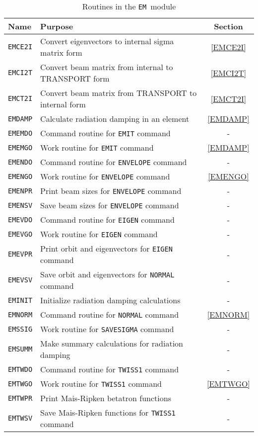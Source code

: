 \begin{table}[h]
\centering
\caption{Routines in the {\tt EM}~module}
\label{T-EM}
\vspace{1ex}
\begin{tabular}{|l|p{}|c|}
\hline
Name&Purpose&Section\\
\hline
\tt EMCE2I&Convert eigenvectors to internal sigma matrix form&
  \ref{EMCE2I}\\
\tt EMCI2T&Convert beam matrix from internal to TRANSPORT form&
  \ref{EMCI2T}\\
\tt EMCT2I&Convert beam matrix from TRANSPORT to internal form&
  \ref{EMCT2I}\\
\tt EMDAMP&Calculate radiation damping in an element&
  \ref{EMDAMP}\\
\tt EMEMDO&Command routine for {\tt EMIT} command&-\\
\tt EMEMGO&Work routine for {\tt EMIT} command&\ref{EMDAMP}\\
\tt EMENDO&Command routine for {\tt ENVELOPE} command&-\\
\tt EMENGO&Work routine for {\tt ENVELOPE} command&\ref{EMENGO}\\
\tt EMENPR&Print beam sizes for {\tt ENVELOPE} command&-\\
\tt EMENSV&Save beam sizes for {\tt ENVELOPE} command&-\\
\tt EMEVDO&Command routine for {\tt EIGEN} command&-\\
\tt EMEVGO&Work routine for {\tt EIGEN} command&-\\
\tt EMEVPR&Print orbit and eigenvectors for {\tt EIGEN} command&-\\
\tt EMEVSV&Save orbit and eigenvectors for {\tt NORMAL} command&-\\
\tt EMINIT&Initialize radiation damping calculations&-\\
\tt EMNORM&Command routine for {\tt NORMAL} command&\ref{EMNORM}\\
\tt EMSSIG&Work routine for {\tt SAVESIGMA} command&-\\
\tt EMSUMM&Make summary calculations for radiation damping&-\\
\tt EMTWDO&Command routine for {\tt TWISS1} command&-\\
\tt EMTWGO&Work routine for {\tt TWISS1} command&\ref{EMTWGO}\\
\tt EMTWPR&Print Mais-Ripken betatron functions&-\\
\tt EMTWSV&Save Mais-Ripken functions for {\tt TWISS1} command&-\\
\hline
\end{tabular}
\end{table}

